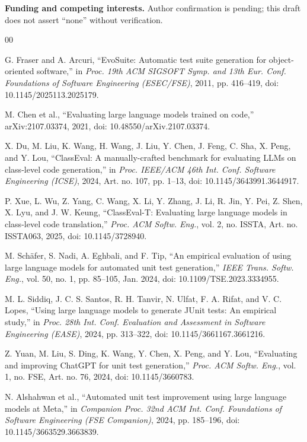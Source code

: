 \documentclass[conference]{IEEEtran}
\begin{document}
\textbf{Funding and competing interests.} Author confirmation is pending; this draft does not assert ``none'' without verification.

\balance
\begin{thebibliography}{00}

G. Fraser and A. Arcuri, ``EvoSuite: Automatic test suite generation for object-oriented software,'' in \emph{Proc. 19th ACM SIGSOFT Symp. and 13th Eur. Conf. Foundations of Software Engineering (ESEC/FSE)}, 2011, pp. 416--419, doi: 10.1145/2025113.2025179.

M. Chen et al., ``Evaluating large language models trained on code,'' arXiv:2107.03374, 2021, doi: 10.48550/arXiv.2107.03374.

X. Du, M. Liu, K. Wang, H. Wang, J. Liu, Y. Chen, J. Feng, C. Sha, X. Peng, and Y. Lou, ``ClassEval: A manually-crafted benchmark for evaluating LLMs on class-level code generation,'' in \emph{Proc. IEEE/ACM 46th Int. Conf. Software Engineering (ICSE)}, 2024, Art. no. 107, pp. 1--13, doi: 10.1145/3643991.3644917.

P. Xue, L. Wu, Z. Yang, C. Wang, X. Li, Y. Zhang, J. Li, R. Jin, Y. Pei, Z. Shen, X. Lyu, and J. W. Keung, ``ClassEval-T: Evaluating large language models in class-level code translation,'' \emph{Proc. ACM Softw. Eng.}, vol. 2, no. ISSTA, Art. no. ISSTA063, 2025, doi: 10.1145/3728940.

M. Sch\"afer, S. Nadi, A. Eghbali, and F. Tip, ``An empirical evaluation of using large language models for automated unit test generation,'' \emph{IEEE Trans. Softw. Eng.}, vol. 50, no. 1, pp. 85--105, Jan. 2024, doi: 10.1109/TSE.2023.3334955.

M. L. Siddiq, J. C. S. Santos, R. H. Tanvir, N. Ulfat, F. A. Rifat, and V. C. Lopes, ``Using large language models to generate JUnit tests: An empirical study,'' in \emph{Proc. 28th Int. Conf. Evaluation and Assessment in Software Engineering (EASE)}, 2024, pp. 313--322, doi: 10.1145/3661167.3661216.

Z. Yuan, M. Liu, S. Ding, K. Wang, Y. Chen, X. Peng, and Y. Lou, ``Evaluating and improving ChatGPT for unit test generation,'' \emph{Proc. ACM Softw. Eng.}, vol. 1, no. FSE, Art. no. 76, 2024, doi: 10.1145/3660783.

N. Alshahwan et al., ``Automated unit test improvement using large language models at Meta,'' in \emph{Companion Proc. 32nd ACM Int. Conf. Foundations of Software Engineering (FSE Companion)}, 2024, pp. 185--196, doi: 10.1145/3663529.3663839.


\end{thebibliography}
\end{document}

